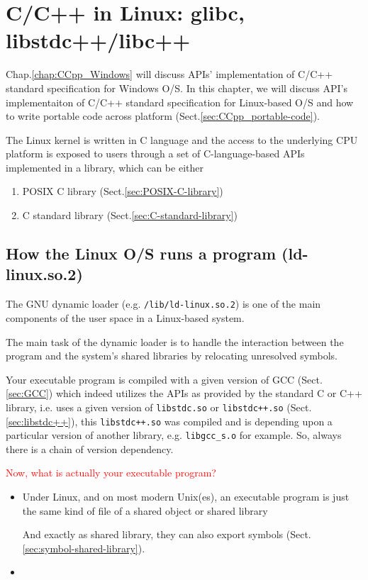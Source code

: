 \chapter{C/C++ in Linux: glibc, libstdc++/libc++}
\label{chap:CCpp_Linux}

Chap.\ref{chap:CCpp_Windows} will discuss APIs' implementation of C/C++ standard
specification for Windows O/S.
In this chapter, we will discuss API's implementaiton of C/C++ standard
specification for Linux-based O/S and how to write portable code across platform
(Sect.\ref{sec:CCpp_portable-code}).

The Linux kernel is written in C language and the access to the underlying CPU
platform is exposed to users through a set of C-language-based APIs implemented
in a library, which can be either
\begin{enumerate}
  \item POSIX C library (Sect.\ref{sec:POSIX-C-library})
  
  \item C standard library (Sect.\ref{sec:C-standard-library})
\end{enumerate}


\section{How the Linux O/S runs a program (ld-linux.so.2)}
\label{sec:how-linux-run-a-program}

The GNU dynamic loader (e.g. \verb!/lib/ld-linux.so.2!) is one of the main
components of the user space in a Linux-based system.

The main task of the dynamic loader is to handle the interaction between the
program and the system's shared libraries by relocating unresolved symbols.


Your executable program is compiled with a given version of GCC
(Sect.\ref{sec:GCC}) which indeed utilizes the APIs as provided by the standard
C or C++ library, i.e. uses a given version of \verb!libstdc.so! or
\verb!libstdc++.so! (Sect.\ref{sec:libstdc++}), this \verb!libstdc++.so! was
compiled and is depending upon a particular version of another library, e.g.
\verb!libgcc_s.o! for example. So, always there is a chain of version
dependency.
  
  
\textcolor{red}{Now, what is actually your executable program?}
\begin{itemize}
  
  \item Under Linux, and on most modern Unix(es), an executable program is just
  the same kind of file of a shared object or shared library
  
  And exactly as shared library, they can also export symbols (Sect.\ref{sec:symbol-shared-library}).
  
  \item 
\end{itemize}

